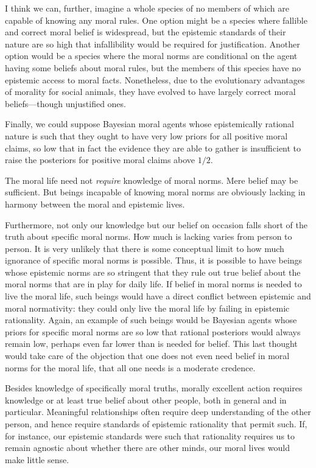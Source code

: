 I think we can, further, imagine a whole species of no members of which are capable of knowing any moral rules. 
One option might be a species where fallible and correct moral belief is widespread, but the epistemic standards of 
their nature are so high that infallibility would be required for justification. Another option would be a species 
where the moral norms are conditional on the agent having some beliefs about moral rules, but the members of this 
species have no epistemic access to moral facts. Nonetheless, due to the evolutionary advantages of morality for 
social animals, they have evolved to have largely correct moral beliefs---though unjustified ones. 

Finally, we could suppose Bayesian moral agents whose epistemically rational nature is such that they ought to have 
very low priors for all positive moral claims, so low that in fact the evidence they are able to gather is 
insufficient to raise the posteriors for positive moral claims above $1/2$. 

The moral life need not \textit{require} knowledge of moral norms. Mere belief may be sufficient. But beings incapable
of knowing moral norms are obviously lacking in harmony between the moral and epistemic lives. 

Furthermore, not only our knowledge but our belief on occasion falls short of the truth about specific moral norms.
How much is lacking varies from person to person. It is very unlikely that there is some conceptual limit to how much
ignorance of specific moral norms is possible. Thus, it is possible to have beings whose epistemic norms are so stringent
that they rule out true belief about the moral norms that are in play for daily life. If belief in moral norms is needed 
to live the moral life, such beings would have a direct conflict between epistemic and moral normativity: they could only 
live the moral life by failing in epistemic rationality. Again, an example of such beings would be Bayesian agents whose
priors for specific moral norms are so low that rational posteriors would always remain low, perhaps even far lower than 
is needed for belief. This last thought would take care of the objection that one does not even need belief in moral norms for the moral life, that all one needs is a moderate credence. 

Besides knowledge of specifically moral truths, morally excellent action requires knowledge or at least true belief about 
other people, both in general and in particular. Meaningful relationships often require deep understanding of the other 
person, and hence require standards of epistemic rationality that permit such. If, for instance, our epistemic standards
were such that rationality requires us to remain agnostic about whether there are other minds, our moral lives would 
make little sense. 

